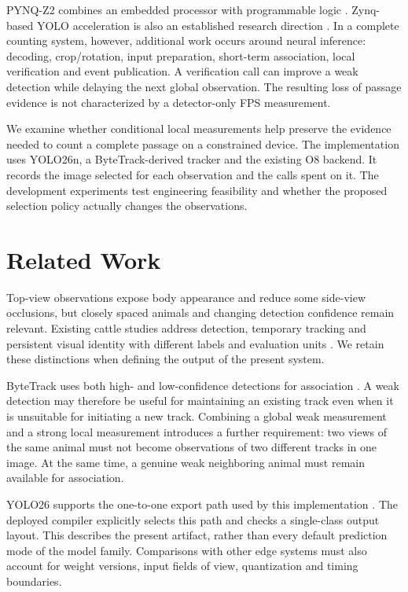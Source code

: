 \documentclass[journal]{IEEEtran}
\begin{document}
PYNQ-Z2 combines an embedded processor with programmable logic \cite{pynqz2}. Zynq-based YOLO acceleration is also an established research direction \cite{zynq_yolo_2024}. In a complete counting system, however, additional work occurs around neural inference: decoding, crop/rotation, input preparation, short-term association, local verification and event publication. A verification call can improve a weak detection while delaying the next global observation. The resulting loss of passage evidence is not characterized by a detector-only FPS measurement.

We examine whether conditional local measurements help preserve the evidence needed to count a complete passage on a constrained device. The implementation uses YOLO26n, a ByteTrack-derived tracker and the existing O8 backend. It records the image selected for each observation and the calls spent on it. The development experiments test engineering feasibility and whether the proposed selection policy actually changes the observations.

\section{Related Work}
Top-view observations expose body appearance and reduce some side-view occlusions, but closely spaced animals and changing detection confidence remain relevant. Existing cattle studies address detection, temporary tracking and persistent visual identity with different labels and evaluation units \cite{cattleeyeview,cattle_id_2024,black_cattle_2025}. We retain these distinctions when defining the output of the present system.

ByteTrack uses both high- and low-confidence detections for association \cite{bytetrack}. A weak detection may therefore be useful for maintaining an existing track even when it is unsuitable for initiating a new track. Combining a global weak measurement and a strong local measurement introduces a further requirement: two views of the same animal must not become observations of two different tracks in one image. At the same time, a genuine weak neighboring animal must remain available for association.

YOLO26 supports the one-to-one export path used by this implementation \cite{yolo26}. The deployed compiler explicitly selects this path and checks a single-class output layout. This describes the present artifact, rather than every default prediction mode of the model family. Comparisons with other edge systems must also account for weight versions, input fields of view, quantization and timing boundaries.
\end{document}
